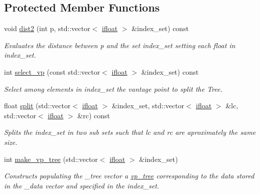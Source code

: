\subsection*{Protected Member Functions}
\begin{DoxyCompactItemize}
\item 
\hypertarget{classtree_1_1cpu_1_1vp__tree_a1610ad0a015eb7634590fab15eddc464}{}void \hyperlink{classtree_1_1cpu_1_1vp__tree_a1610ad0a015eb7634590fab15eddc464}{dist2} (int p, std\+::vector$<$ \hyperlink{types_8hpp_a4b0dedd1120697012e61e312aa7058a8}{ifloat} $>$ \&index\+\_\+set) const \label{classtree_1_1cpu_1_1vp__tree_a1610ad0a015eb7634590fab15eddc464}

\begin{DoxyCompactList}\small\item\em Evaluates the distance between p and the set index\+\_\+set setting each float in index\+\_\+set. \end{DoxyCompactList}\item 
int \hyperlink{classtree_1_1cpu_1_1vp__tree_acba29bccad136acc95faf4be2929f207}{select\+\_\+vp} (const std\+::vector$<$ \hyperlink{types_8hpp_a4b0dedd1120697012e61e312aa7058a8}{ifloat} $>$ \&index\+\_\+set) const 
\begin{DoxyCompactList}\small\item\em Select among elements in index\+\_\+set the vantage point to split the Tree. \end{DoxyCompactList}\item 
float \hyperlink{classtree_1_1cpu_1_1vp__tree_a1959d61a75183d3f37a6923c382174bb}{split} (std\+::vector$<$ \hyperlink{types_8hpp_a4b0dedd1120697012e61e312aa7058a8}{ifloat} $>$ \&index\+\_\+set, std\+::vector$<$ \hyperlink{types_8hpp_a4b0dedd1120697012e61e312aa7058a8}{ifloat} $>$ \&lc, std\+::vector$<$ \hyperlink{types_8hpp_a4b0dedd1120697012e61e312aa7058a8}{ifloat} $>$ \&rc) const 
\begin{DoxyCompactList}\small\item\em Splits the index\+\_\+set in two sub sets such that lc and rc are aproximately the same size. \end{DoxyCompactList}\item 
\hypertarget{classtree_1_1cpu_1_1vp__tree_ae8deb69c56e005e07a663872042ac5f2}{}int \hyperlink{classtree_1_1cpu_1_1vp__tree_ae8deb69c56e005e07a663872042ac5f2}{make\+\_\+vp\+\_\+tree} (std\+::vector$<$ \hyperlink{types_8hpp_a4b0dedd1120697012e61e312aa7058a8}{ifloat} $>$ \&index\+\_\+set)\label{classtree_1_1cpu_1_1vp__tree_ae8deb69c56e005e07a663872042ac5f2}

\begin{DoxyCompactList}\small\item\em Constructs populating the \+\_\+tree vector a \hyperlink{classtree_1_1cpu_1_1vp__tree}{vp\+\_\+tree} corresponding to the data stored in the \+\_\+data vector and specified in the index\+\_\+set. \end{DoxyCompactList}\end{DoxyCompactItemize}
